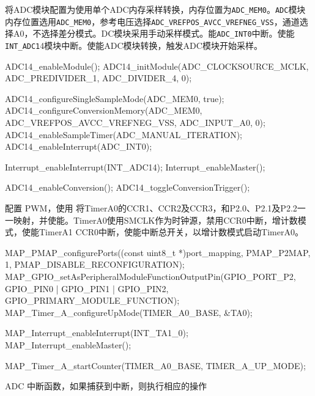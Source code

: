 \documentclass[a4paper,10pt,UTF8]{paper}
\numberwithin{equation}{section}
\numberwithin{figure}{section}
\begin{document}
将ADC模块配置为使用单个ADC内存采样转换，内存位置为\texttt{ADC\_MEM0}。\texttt{ADC}模块内存位置选用\texttt{ADC\_MEM0}，参考电压选择\texttt{ADC\_VREFPOS\_AVCC\_VREFNEG\_VSS}，通道选择A0，不选择差分模式。DC模块采用手动采样模式。能\texttt{ADC\_INT0}中断。使能\texttt{INT\_ADC1}4模块中断。使能ADC模块转换，触发ADC模块开始采样。

\begin{ccode}
    ADC14_enableModule(); 
    ADC14_initModule(ADC_CLOCKSOURCE_MCLK, ADC_PREDIVIDER_1, ADC_DIVIDER_4, 0); 

    ADC14_configureSingleSampleMode(ADC_MEM0, true);  
    ADC14_configureConversionMemory(ADC_MEM0, ADC_VREFPOS_AVCC_VREFNEG_VSS, ADC_INPUT_A0, 0);
    ADC14_enableSampleTimer(ADC_MANUAL_ITERATION);
    ADC14_enableInterrupt(ADC_INT0);  

    Interrupt_enableInterrupt(INT_ADC14);
    Interrupt_enableMaster();  

    ADC14_enableConversion();  
    ADC14_toggleConversionTrigger();
\end{ccode}

配置 PWM，使用 将TimerA0的CCR1、CCR2及CCR3，和P2.0、P2.1及P2.2一一映射，并使能。TimerA0使用SMCLK作为时钟源，禁用CCR0中断，增计数模式，使能TimerA1 CCR0中断，使能中断总开关，以增计数模式启动TimerA0。

\begin{ccode}
    MAP_PMAP_configurePorts((const uint8_t *)port_mapping, PMAP_P2MAP, 1, PMAP_DISABLE_RECONFIGURATION);
    MAP_GPIO_setAsPeripheralModuleFunctionOutputPin(GPIO_PORT_P2, GPIO_PIN0 | GPIO_PIN1 | GPIO_PIN2, GPIO_PRIMARY_MODULE_FUNCTION);
    MAP_Timer_A_configureUpMode(TIMER_A0_BASE, &TA0);

    MAP_Interrupt_enableInterrupt(INT_TA1_0); 
    MAP_Interrupt_enableMaster();   

    MAP_Timer_A_startCounter(TIMER_A0_BASE, TIMER_A_UP_MODE);
\end{ccode}

ADC 中断函数，如果捕获到中断，则执行相应的操作
\end{document}
